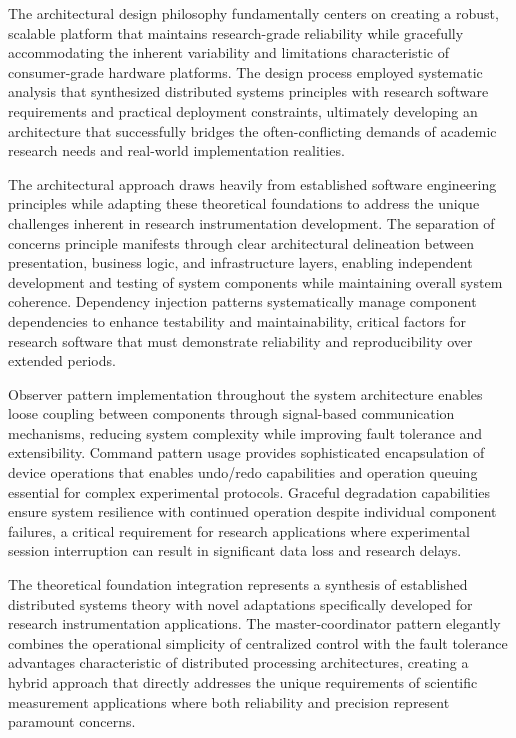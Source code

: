 \documentclass[11pt,a4paper]{article}
\begin{document}
The architectural design philosophy fundamentally centers on creating a robust, scalable platform that maintains
research-grade reliability while gracefully accommodating the inherent variability and limitations characteristic of
consumer-grade hardware platforms. The design process employed systematic analysis that synthesized distributed systems
principles with research software requirements and practical deployment constraints, ultimately developing an
architecture that successfully bridges the often-conflicting demands of academic research needs and real-world
implementation realities.

The architectural approach draws heavily from established software engineering principles while adapting these
theoretical foundations to address the unique challenges inherent in research instrumentation development. The
separation of concerns principle manifests through clear architectural delineation between presentation, business logic,
and infrastructure layers, enabling independent development and testing of system components while maintaining overall
system coherence. Dependency injection patterns systematically manage component dependencies to enhance testability and
maintainability, critical factors for research software that must demonstrate reliability and reproducibility over
extended periods.

Observer pattern implementation throughout the system architecture enables loose coupling between components through
signal-based communication mechanisms, reducing system complexity while improving fault tolerance and extensibility.
Command pattern usage provides sophisticated encapsulation of device operations that enables undo/redo capabilities and
operation queuing essential for complex experimental protocols. Graceful degradation capabilities ensure system
resilience with continued operation despite individual component failures, a critical requirement for research
applications where experimental session interruption can result in significant data loss and research delays.

The theoretical foundation integration represents a synthesis of established distributed systems theory with novel
adaptations specifically developed for research instrumentation applications. The master-coordinator pattern elegantly
combines the operational simplicity of centralized control with the fault tolerance advantages characteristic of
distributed processing architectures, creating a hybrid approach that directly addresses the unique requirements of
scientific measurement applications where both reliability and precision represent paramount concerns.
\end{document}
